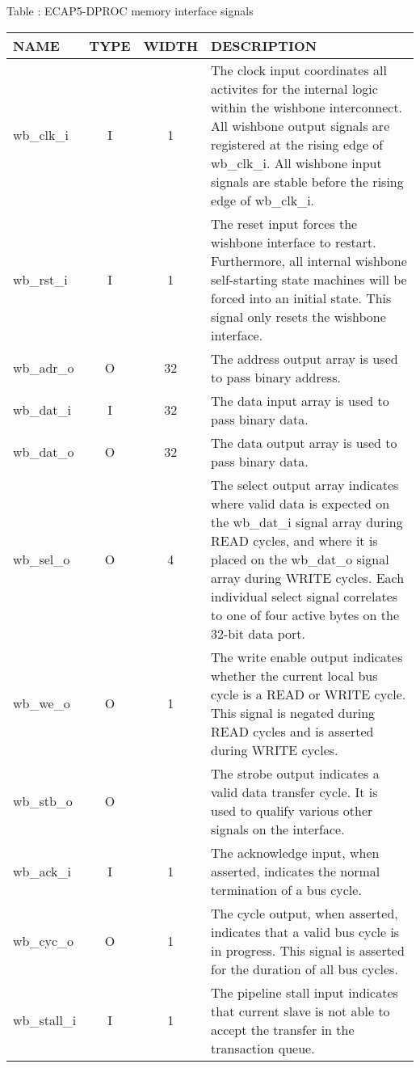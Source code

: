 {
  \vspace{0.5em}
  \begin{center}
    Table \thetable: ECAP5-DPROC memory interface signals \label{tab:memory-interface}
  \end{center}

\footnotesize
\begin{xltabular}{0.9\textwidth}{|l|c|c|X|}
  \hline
  \textbf{NAME} & \textbf{TYPE} & \textbf{WIDTH} & \textbf{DESCRIPTION} \\
  \hline
  wb\_clk\_i & I & 1 & The clock input coordinates all activites for the internal logic within the wishbone interconnect. All wishbone output signals are registered at the rising edge of wb\_clk\_i. All wishbone input signals are stable before the rising edge of wb\_clk\_i. \\
  \hline
  wb\_rst\_i & I & 1 & The reset input forces the wishbone interface to restart. Furthermore, all internal wishbone self-starting state machines will be forced into an initial state. This signal only resets the wishbone interface. \\
  \hline
  wb\_adr\_o & O & 32 & The address output array is used to pass binary address. \\
  \hline
  wb\_dat\_i & I & 32 & The data input array is used to pass binary data. \\
  \hline
  wb\_dat\_o & O & 32 & The data output array is used to pass binary data. \\
  \hline
  wb\_sel\_o & O & 4 & The select output array indicates where valid data is expected on the wb\_dat\_i signal array during READ cycles, and where it is placed on the wb\_dat\_o signal array during WRITE cycles. Each individual select signal correlates to one of four active bytes on the 32-bit data port. \\
  wb\_we\_o & O & 1 & The write enable output indicates whether the current local bus cycle is a READ or WRITE cycle. This signal is negated during READ cycles and is asserted during WRITE cycles. \\
  \hline
  wb\_stb\_o & O &  & The strobe output indicates a valid data transfer cycle. It is used to qualify various other signals on the interface. \\
  \hline
  wb\_ack\_i & I & 1 & The acknowledge input, when asserted, indicates the normal termination of a bus cycle. \\
  \hline
  wb\_cyc\_o & O & 1 & The cycle output, when asserted, indicates that a valid bus cycle is in progress. This signal is asserted for the duration of all bus cycles. \\
  \hline
  wb\_stall\_i & I & 1 & The pipeline stall input indicates that current slave is not able to accept the transfer in the transaction queue. \\
  \hline
\end{xltabular}
}
